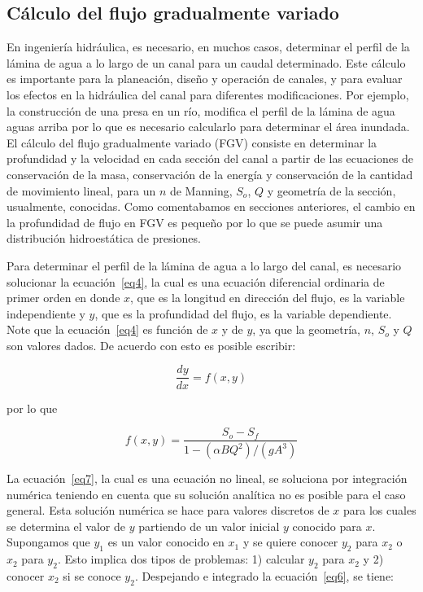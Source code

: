 \documentclass[11pt, oneside]{article}
\begin{document}
\subsection{C\'alculo del flujo gradualmente variado}
En ingenier\'ia hidr\'aulica, es necesario, en muchos casos, determinar el perfil de la l\'amina de agua a lo largo de un canal para un caudal determinado. Este c\'alculo es importante para la planeaci\'on, diseño y operaci\'on de canales, y para evaluar los efectos en la hidr\'aulica del canal para diferentes modificaciones. Por ejemplo, la construcci\'on de una presa en un r\'io, modifica el perfil de la l\'amina de agua aguas arriba por lo que es necesario calcularlo para determinar el \'area inundada. El c\'alculo del flujo gradualmente variado (FGV) consiste en determinar la profundidad y la velocidad en cada secci\'on del canal a partir de las ecuaciones de conservaci\'on de la masa, conservaci\'on de la energ\'ia y conservaci\'on de la cantidad de movimiento lineal, para un $n$ de Manning, $S_o$, $Q$ y geometr\'ia de la secci\'on, usualmente, conocidas. Como comentabamos en secciones anteriores, el cambio en la profundidad de flujo en FGV es pequeño por lo que se puede asumir una distribuci\'on hidroest\'atica de presiones.  

Para determinar el perfil de la l\'amina de agua a lo largo del canal, es necesario solucionar la ecuaci\'on~\ref{eq4}, la cual es una ecuaci\'on diferencial ordinaria de primer orden en donde $x$, que es la longitud en direcci\'on del flujo, es la variable independiente y $y$, que es la profundidad del flujo, es la variable dependiente. Note que la ecuaci\'on~\ref{eq4} es funci\'on de $x$ y de $y$, ya que la geometr\'ia, $n$, $S_o$ y $Q$ son valores dados. De acuerdo con esto es posible escribir:

\begin{equation}
    \frac{dy}{dx} = f(x,y)
\label{eq6}
\end{equation}

por lo que

\begin{equation}
    f(x,y) = \frac{S_o - S_f }{1-\left(\alpha B Q^2 \right) /\left(g A^3 \right)}
\label{eq7}
\end{equation}

La ecuaci\'on~\ref{eq7}, la cual es una ecuaci\'on no lineal,  se soluciona por integraci\'on num\'erica teniendo en cuenta que su soluci\'on anal\'itica no es posible para el caso general. Esta soluci\'on num\'erica se hace para valores discretos de $x$ para los cuales se determina el valor de $y$ partiendo de un valor inicial $y$ conocido para $x$. Supongamos que $y_1$ es un valor conocido en $x_1$ y se quiere conocer $y_2$ para $x_2$ o $x_2$ para $y_2$. Esto implica dos tipos de problemas: 1) calcular $y_2$ para $x_2$ y 2) conocer $x_2$ si se conoce $y_2$. Despejando e integrado la ecuaci\'on~\ref{eq6}, se tiene:
\end{document}
